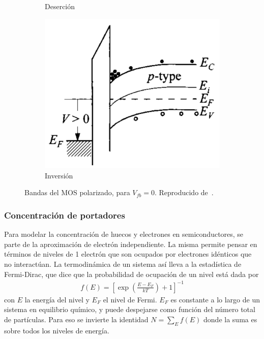 \begin{figure}[H]
\begin{subfigure}[b]{.3\textwidth}
        \label{fig:mosdesercion}
        \caption{Deserción}
    \end{subfigure}
    \begin{subfigure}[b]{.3\textwidth}
        \includegraphics{figuras/mos/inversion.png}
        \caption{Inversión}
        \label{fig:mosinversion}
    \end{subfigure}
    \caption{Bandas del MOS polarizado, para $V_{fb}=0$.
Reproducido de~\cite{sze_physics_2007}.}
    \label{fig:polarizacionmos}
\end{figure}
%
\subsubsection{Concentración de portadores}
Para modelar la concentración de huecos y electrones en semiconductores,
se parte de la aproximación de electrón independiente.
La misma permite pensar en términos de niveles de 1 electrón que son ocupados
por electrones idénticos que no interactúan.
La termodinámica de un sistema así
lleva a la estadística de Fermi-Dirac, 
que dice que la probabilidad de ocupación de un nivel está dada por
\begin{align*}
    f(E) = \left[\exp\left(\frac{E-E_F}{kT}\right)+1\right]^{-1}
\end{align*}
con $E$ la energía del nivel y $E_F$ el nivel de Fermi.
$E_F$ es constante a lo largo de un sistema en equilibrio
químico,
y puede despejarse como función del número total de partículas.
Para eso se invierte la identidad $N=\sum_E f(E)$ donde la suma es sobre
todos los niveles de energía.

